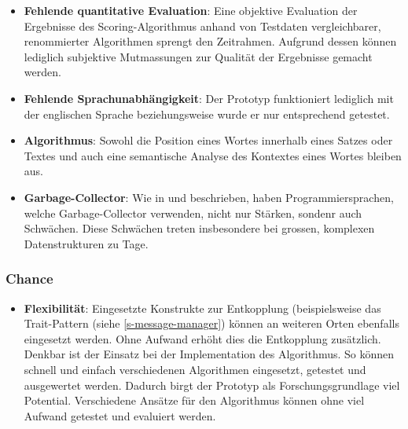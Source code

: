 \begin{itemize}
    \item \textbf{Fehlende quantitative Evaluation}: Eine objektive Evaluation der Ergebnisse des Scoring-Algorithmus anhand von Testdaten vergleichbarer, renommierter Algorithmen sprengt den Zeitrahmen. Aufgrund dessen können lediglich subjektive Mutmassungen zur Qualität der Ergebnisse gemacht werden.
    \item \textbf{Fehlende Sprachunabhängigkeit}: Der Prototyp funktioniert lediglich mit der englischen Sprache beziehungsweise wurde er nur entsprechend getestet.
    \item \textbf{Algorithmus}: Sowohl die Position eines Wortes innerhalb eines Satzes oder Textes und auch eine semantische Analyse des Kontextes eines Wortes bleiben aus.
    \item \textbf{Garbage-Collector}: Wie in \cite[S.~1-3]{cohen2015data} und \cite[S.~1-2]{nguyen2016yak} beschrieben, haben Programmiersprachen, welche Garbage-Collector verwenden, nicht nur Stärken, sondenr auch Schwächen. Diese Schwächen treten insbesondere bei grossen, komplexen Datenstrukturen zu Tage.
    
\end{itemize}

\subsubsection{Chance}

\begin{itemize}
    \item \textbf{Flexibilität}: Eingesetzte Konstrukte zur Entkopplung (beispielsweise das Trait-Pattern (siehe \autoref{s-message-manager}) können an weiteren Orten ebenfalls eingesetzt werden. Ohne Aufwand er\-höht dies die Entkopplung zusätzlich. Denkbar ist der Einsatz bei der Implementation des Algorithmus. So können schnell und einfach verschiedenen Algorithmen eingesetzt, getestet und ausgewertet werden. Dadurch birgt der Prototyp als Forschungsgrundlage viel Potential. Verschiedene Ansätze für den Algorithmus können ohne viel Aufwand getestet und evaluiert werden.
\end{itemize}


